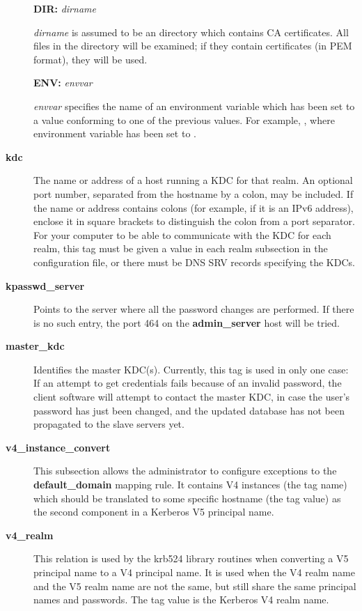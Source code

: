 \documentclass[letterpaper,10pt,english]{sphinxmanual}
\begin{document}
\begin{description}
\textbf{DIR:} \emph{dirname}

\emph{dirname} is assumed to be an directory which contains CA certificates.
All files in the directory will be examined; if they contain certificates
(in PEM format), they will be used.

\textbf{ENV:} \emph{envvar}

\emph{envvar} specifies the name of an environment variable which has been set
to a value conforming to one of the previous values.  For example,
, where environment variable  has
been set to .

\item[{\textbf{kdc}}] \leavevmode
The name or address of a host running a KDC for that realm.  An
optional port number, separated from the hostname by a colon, may
be included.  If the name or address contains colons (for example,
if it is an IPv6 address), enclose it in square brackets to
distinguish the colon from a port separator.  For your computer to
be able to communicate with the KDC for each realm, this tag must
be given a value in each realm subsection in the configuration
file, or there must be DNS SRV records specifying the KDCs.

\item[{\textbf{kpasswd\_server}}] \leavevmode
Points to the server where all the password changes are performed.
If there is no such entry, the port 464 on the \textbf{admin\_server}
host will be tried.

\item[{\textbf{master\_kdc}}] \leavevmode
Identifies the master KDC(s).  Currently, this tag is used in only
one case: If an attempt to get credentials fails because of an
invalid password, the client software will attempt to contact the
master KDC, in case the user's password has just been changed, and
the updated database has not been propagated to the slave servers
yet.

\item[{\textbf{v4\_instance\_convert}}] \leavevmode
This subsection allows the administrator to configure exceptions
to the \textbf{default\_domain} mapping rule.  It contains V4 instances
(the tag name) which should be translated to some specific
hostname (the tag value) as the second component in a Kerberos V5
principal name.

\item[{\textbf{v4\_realm}}] \leavevmode
This relation is used by the krb524 library routines when
converting a V5 principal name to a V4 principal name.  It is used
when the V4 realm name and the V5 realm name are not the same, but
still share the same principal names and passwords. The tag value
is the Kerberos V4 realm name.

\end{description}
\end{document}
